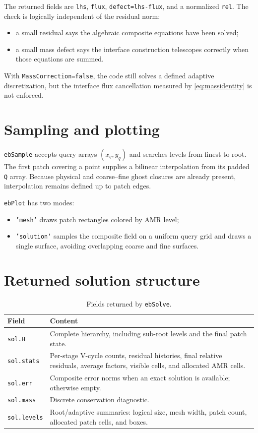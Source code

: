 \documentclass[11pt,oneside,openany]{book}
\newcommand{\code}[1]{\textnormal{\texttt{#1}}}
\begin{document}
The returned fields are \code{lhs}, \code{flux}, \code{defect=lhs-flux}, and a normalized \code{rel}. The check is logically independent of the residual norm:
\begin{itemize}
\item a small residual says the algebraic composite equations have been solved;
\item a small mass defect says the interface construction telescopes correctly when those equations are summed.
\end{itemize}
With \code{MassCorrection=false}, the code still solves a defined adaptive discretization, but the interface flux cancellation measured by \cref{eq:massidentity} is not enforced.

\section{Sampling and plotting}
\code{ebSample} accepts query arrays $(x_q,y_q)$ and searches levels from finest to root. The first patch covering a point supplies a bilinear interpolation from its padded \code{Q} array. Because physical and coarse--fine ghost closures are already present, interpolation remains defined up to patch edges.

\code{ebPlot} has two modes:
\begin{itemize}
\item \code{'mesh'} draws patch rectangles colored by AMR level;
\item \code{'solution'} samples the composite field on a uniform query grid and draws a single surface, avoiding overlapping coarse and fine surfaces.
\end{itemize}

\section{Returned solution structure}
\begin{table}[htbp]
\centering
\small
\begin{tabularx}{\textwidth}{@{}p{}X@{}}
\toprule
Field & Content \\
\midrule
\code{sol.H} & Complete hierarchy, including sub-root levels and the final patch state. \\
\code{sol.stats} & Per-stage V-cycle counts, residual histories, final relative residuals, average factors, visible cells, and allocated AMR cells. \\
\code{sol.err} & Composite error norms when an exact solution is available; otherwise empty. \\
\code{sol.mass} & Discrete conservation diagnostic. \\
\code{sol.levels} & Root/adaptive summaries: logical size, mesh width, patch count, allocated patch cells, and boxes. \\
\bottomrule
\end{tabularx}
\caption{Fields returned by \code{ebSolve}.}
\end{table}
\end{document}
